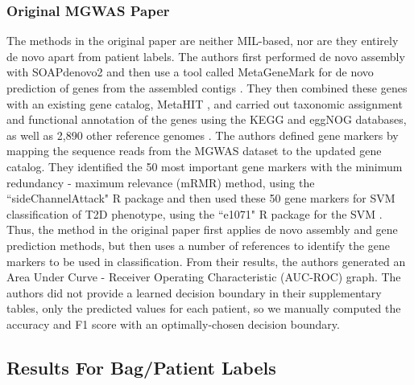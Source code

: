 \subsubsection{Original MGWAS Paper}

The methods in the original paper are neither MIL-based, nor are they entirely de novo apart from patient labels. The authors first performed de novo assembly with SOAPdenovo2 \cite{luo12} and then use a tool called MetaGeneMark \cite{zhu10, besemer99} for de novo prediction of genes from the assembled contigs \cite{qin041012}. They then combined these genes with an existing gene catalog, MetaHIT \cite{qin030410}, and carried out taxonomic assignment and functional annotation of the genes using the KEGG \cite{kanehisa00} and eggNOG \cite{powell12} databases, as well as 2,890 other reference genomes \cite{qin041012}. The authors defined gene markers by mapping the sequence reads from the MGWAS dataset to the updated gene catalog. They identified the 50 most important gene markers with the minimum redundancy - maximum relevance (mRMR) \cite{peng05} method, using the ``sideChannelAttack" R package and then used these 50 gene markers for SVM classification of T2D phenotype, using the ``e1071" R package for the SVM \cite{qin041012}. Thus, the method in the original paper first applies de novo assembly and gene prediction methods, but then uses a number of references to identify the gene markers to be used in classification. From their results, the authors generated an Area Under Curve - Receiver Operating Characteristic (AUC-ROC) graph. The authors did not provide a learned decision boundary in their supplementary tables, only the predicted values for each patient, so we manually computed the accuracy and F1 score with an optimally-chosen decision boundary. 



\subsection{Results For Bag/Patient Labels}

